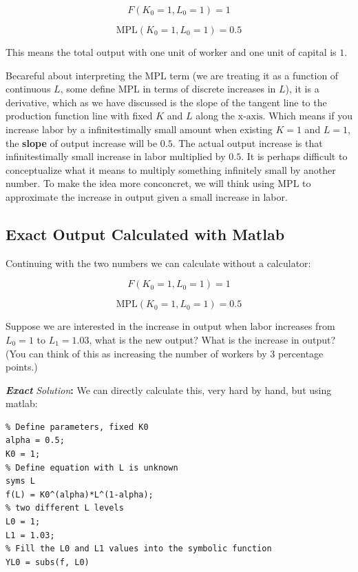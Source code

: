 \documentclass[
]{book}
\begin{document}
\[F(K_0 =1,L_0 =1)=1\]

\[\textrm{MPL}(K_0 =1,L_0 =1)=0.5\]

This means the total output with one unit of worker and one unit of
capital is \(1\).

Becareful about interpreting the \(\textrm{MPL}\) term (we are treating it
as a function of continuous \(L\), some define MPL in terms of discrete
increases in \(L\)), it is a derivative, which as we have discussed is the
slope of the tangent line to the production function line with fixed \(K\)
and \(L\) along the \(\textrm{x}\textrm{-}\textrm{axis}\). Which means if
you increase labor by a infinitestimally small amount when existing
\(K=1\) and \(L=1\), the \textbf{slope} of output increase will be \(0.5\). The
actual output increase is that infinitestimally small increase in labor
multiplied by \(0.5\). It is perhaps difficult to conceptualize what it
means to multiply something infinitely small by another number. To make
the idea more conconcret, we will think using \(\textrm{MPL}\) to
approximate the increase in output given a small increase in labor.

\hypertarget{exact-output-calculated-with-matlab}{%
\subsection{Exact Output Calculated with Matlab}\label{exact-output-calculated-with-matlab}}

Continuing with the two numbers we can calculate without a calculator:

\[F(K_0 =1,L_0 =1)=1\]

\[\textrm{MPL}(K_0 =1,L_0 =1)=0.5\]

Suppose we are interested in the increase in output when labor increases
from \(L_0 =1\) to \(L_1 =1.03\), what is the new output? What is the
increase in output? (You can think of this as increasing the number of
workers by 3 percentage points.)

\textbf{\emph{Exact}} \emph{Solution}\textbf{:} We can directly calculate this, very hard by
hand, but using matlab:

\begin{verbatim}
% Define parameters, fixed K0
alpha = 0.5;
K0 = 1;
% Define equation with L is unknown
syms L
f(L) = K0^(alpha)*L^(1-alpha);
% two different L levels
L0 = 1;
L1 = 1.03;
% Fill the L0 and L1 values into the symbolic function
YL0 = subs(f, L0)
\end{verbatim}
\end{document}
